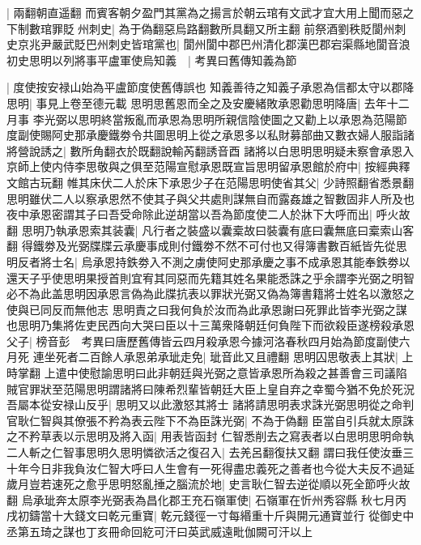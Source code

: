 |{
	兩翻朝直遥翻}
而賓客朝夕盈門其黨為之揚言於朝云琯有文武才宜大用上聞而惡之下制數琯罪貶州刺史|{
	為于偽翻惡烏路翻數所具翻又所主翻}
前祭酒劉秩貶閬州刺史京兆尹嚴武貶巴州刺史皆琯黨也|{
	閬州閬中郡巴州清化郡漢巴郡宕渠縣地閬音浪}
初史思明以列將事平盧軍使烏知義　|{
	考異曰舊傳知義為節}


|{
	度使按安禄山始為平盧節度使舊傳誤也}
知義善待之知義子承恩為信都太守以郡降思明|{
	事見上卷至德元載}
思明思舊恩而全之及安慶緒敗承恩勸思明降唐|{
	去年十二月事}
李光弼以思明終當叛亂而承恩為思明所親信陰使圖之又勸上以承恩為范陽節度副使賜阿史那承慶鐵劵令共圖思明上從之承恩多以私財募部曲又數衣婦人服詣諸將營說誘之|{
	數所角翻衣於既翻說輸芮翻誘音酉}
諸將以白思明思明疑未察會承恩入京師上使内侍李思敬與之俱至范陽宣慰承恩既宣旨思明留承恩館於府中|{
	按經典釋文館古玩翻}
帷其床伏二人於床下承恩少子在范陽思明使省其父|{
	少詩照翻省悉景翻思明雖伏二人以察承恩然不使其子與父共處則謀無自而露姦雄之智數固非人所及也}
夜中承恩密謂其子曰吾受命除此逆胡當以吾為節度使二人於牀下大呼而出|{
	呼火故翻}
思明乃執承恩索其装囊|{
	凡行者之裝盛以囊槖故曰裝囊有底曰囊無底曰槖索山客翻}
得鐵劵及光弼牒牒云承慶事成則付鐵劵不然不可付也又得簿書數百紙皆先從思明反者將士名|{
	烏承恩持鉄劵入不測之虜使阿史那承慶之事不成承恩其能奉鉄劵以還天子乎使思明果授首則宜宥其同惡而先籍其姓名果能悉誅之乎余謂李光弼之明智必不為此盖思明因承恩言偽為此牒抗表以罪狀光弼又偽為簿書籍將士姓名以激怒之使與已同反而無他志}
思明責之曰我何負於汝而為此承恩謝曰死罪此皆李光弼之謀也思明乃集將佐吏民西向大哭曰臣以十三萬衆降朝廷何負陛下而欲殺臣遂榜殺承恩父子|{
	榜音彭　考異曰唐歷舊傳皆云四月殺承恩今據河洛春秋四月始為節度副使六月死}
連坐死者二百餘人承恩弟承玼走免|{
	玼音此又且禮翻}
思明囚思敬表上其狀|{
	上時掌翻}
上遣中使慰諭思明曰此非朝廷與光弼之意皆承恩所為殺之甚善會三司議陷賊官罪狀至范陽思明謂諸將曰陳希烈輩皆朝廷大臣上皇自弃之幸蜀今猶不免於死況吾屬本從安禄山反乎|{
	思明又以此激怒其將士}
諸將請思明表求誅光弼思明從之命判官耿仁智與其僚張不矜為表云陛下不為臣誅光弼|{
	不為于偽翻}
臣當自引兵就太原誅之不矜草表以示思明及將入函|{
	用表皆函封}
仁智悉削去之寫表者以白思明思明命執二人斬之仁智事思明久思明憐欲活之復召入|{
	去羌呂翻復扶又翻}
謂曰我任使汝垂三十年今日非我負汝仁智大呼曰人生會有一死得盡忠義死之善者也今從大夫反不過延歲月豈若速死之愈乎思明怒亂捶之腦流於地|{
	史言耿仁智去逆從順以死全節呼火故翻}
烏承玼奔太原李光弼表為昌化郡王充石嶺軍使|{
	石嶺軍在忻州秀容縣}
秋七月丙戌初鑄當十大錢文曰乾元重寶|{
	乾元錢徑一寸每緡重十斤與開元通寶並行}
從御史中丞第五琦之謀也丁亥冊命回紇可汗曰英武威遠毗伽闕可汗以上

